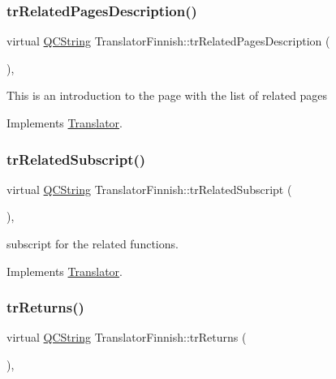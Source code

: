 \subsubsection{\texorpdfstring{trRelatedPagesDescription()}{trRelatedPagesDescription()}}
{\footnotesize\ttfamily virtual \mbox{\hyperlink{class_q_c_string}{Q\+C\+String}} Translator\+Finnish\+::tr\+Related\+Pages\+Description (\begin{DoxyParamCaption}{ }\end{DoxyParamCaption})\hspace{0.3cm}{\ttfamily [inline]}, {\ttfamily [virtual]}}

This is an introduction to the page with the list of related pages 

Implements \mbox{\hyperlink{class_translator}{Translator}}.

\mbox{\label{class_translator_finnish_aeec37a394234b0c1f51d1d01a7184c7a}} 
\subsubsection{\texorpdfstring{trRelatedSubscript()}{trRelatedSubscript()}}
{\footnotesize\ttfamily virtual \mbox{\hyperlink{class_q_c_string}{Q\+C\+String}} Translator\+Finnish\+::tr\+Related\+Subscript (\begin{DoxyParamCaption}{ }\end{DoxyParamCaption})\hspace{0.3cm}{\ttfamily [inline]}, {\ttfamily [virtual]}}

subscript for the related functions. 

Implements \mbox{\hyperlink{class_translator}{Translator}}.

\mbox{\label{class_translator_finnish_ab97f73d9a11298da4fde0d735c601143}} 
\subsubsection{\texorpdfstring{trReturns()}{trReturns()}}
{\footnotesize\ttfamily virtual \mbox{\hyperlink{class_q_c_string}{Q\+C\+String}} Translator\+Finnish\+::tr\+Returns (\begin{DoxyParamCaption}{ }\end{DoxyParamCaption})\hspace{0.3cm}{\ttfamily [inline]}, {\ttfamily [virtual]}}

